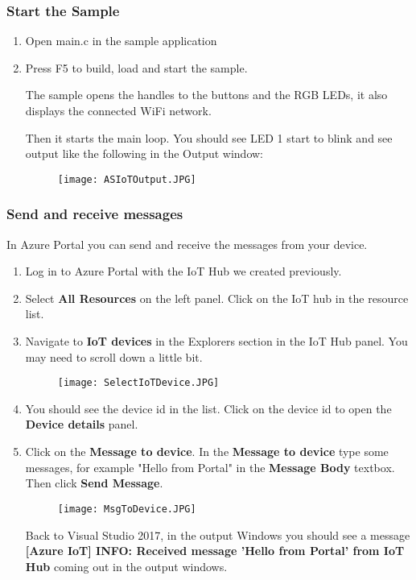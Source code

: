 \subsubsection{Start the Sample}
\begin{enumerate}
    \item Open main.c in the sample application
    \item Press F5 to build, load and start the sample.
    
    The sample opens the handles to the buttons and the RGB LEDs, it also displays the connected WiFi network.

    Then it starts the main loop. You should see LED 1 start to blink and see output like the following in the Output window:
    \begin{figure}[h]
        \centering
        \texttt{[image: ASIoTOutput.JPG]}
    \end{figure}
\end{enumerate} 

\subsubsection{Send and receive messages}
In Azure Portal you can send and receive the messages from your device.
\begin{enumerate}
    \item Log in to Azure Portal with the IoT Hub we created previously.
    \item Select \textbf{All Resources} on the left panel. Click on the IoT hub in the resource list.
    \item Navigate to \textbf{IoT devices} in the Explorers section in the IoT Hub panel. You may need to scroll down a little bit.
    \begin{figure}[h]
        \centering
        \texttt{[image: SelectIoTDevice.JPG]}
    \end{figure}
    \item You should see the device id in the list. Click on the device id to open the \textbf{Device details} panel.
    \item Click on the \textbf{Message to device}. In the \textbf{Message to device} type some messages, for example "Hello from Portal" in the \textbf{Message Body} textbox. Then click \textbf{Send Message}.
    \begin{figure}[h]
        \centering
        \texttt{[image: MsgToDevice.JPG]}
    \end{figure}
    Back to Visual Studio 2017, in the output Windows you should see a message \textbf{[Azure IoT] INFO: Received message 'Hello from Portal' from IoT Hub} coming out in the output windows.
\end{enumerate}

